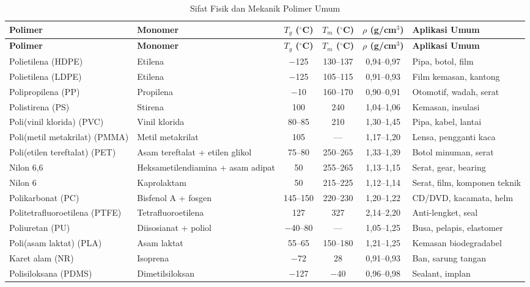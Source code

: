 \documentclass[12pt,a4paper,openany]{book}
\begin{document}
\begin{longtable}{p{3.2cm}p{2.8cm}cccp{2.5cm}}
\caption{Sifat Fisik dan Mekanik Polimer Umum} \\
\toprule
\textbf{Polimer} & \textbf{Monomer} & \textbf{$T_g$ ($^{\circ}$C)} & \textbf{$T_m$ ($^{\circ}$C)} & \textbf{$\rho$ (g/cm$^3$)} & \textbf{Aplikasi Umum} \\
\midrule
\endfirsthead
\toprule
\textbf{Polimer} & \textbf{Monomer} & \textbf{$T_g$ ($^{\circ}$C)} & \textbf{$T_m$ ($^{\circ}$C)} & \textbf{$\rho$ (g/cm$^3$)} & \textbf{Aplikasi Umum} \\
\midrule
\endhead
\bottomrule
\endfoot

Polietilena (HDPE) & Etilena & $-$125 & 130--137 & 0,94--0,97 & Pipa, botol, film \\
Polietilena (LDPE) & Etilena & $-$125 & 105--115 & 0,91--0,93 & Film kemasan, kantong \\
Polipropilena (PP) & Propilena & $-$10 & 160--170 & 0,90--0,91 & Otomotif, wadah, serat \\
Polistirena (PS) & Stirena & 100 & 240 & 1,04--1,06 & Kemasan, insulasi \\
Poli(vinil klorida) (PVC) & Vinil klorida & 80--85 & 210 & 1,30--1,45 & Pipa, kabel, lantai \\
Poli(metil metakrilat) (PMMA) & Metil metakrilat & 105 & --- & 1,17--1,20 & Lensa, pengganti kaca \\
Poli(etilen tereftalat) (PET) & Asam tereftalat + etilen glikol & 75--80 & 250--265 & 1,33--1,39 & Botol minuman, serat \\
Nilon 6,6 & Heksametilendiamina + asam adipat & 50 & 255--265 & 1,13--1,15 & Serat, gear, bearing \\
Nilon 6 & Kaprolaktam & 50 & 215--225 & 1,12--1,14 & Serat, film, komponen teknik \\
Polikarbonat (PC) & Bisfenol A + fosgen & 145--150 & 220--230 & 1,20--1,22 & CD/DVD, kacamata, helm \\
Politetrafluoroetilena (PTFE) & Tetrafluoroetilena & 127 & 327 & 2,14--2,20 & Anti-lengket, seal \\
Poliuretan (PU) & Diisosianat + poliol & $-$40--80 & --- & 1,05--1,25 & Busa, pelapis, elastomer \\
Poli(asam laktat) (PLA) & Asam laktat & 55--65 & 150--180 & 1,21--1,25 & Kemasan biodegradabel \\
Karet alam (NR) & Isoprena & $-$72 & 28 & 0,91--0,93 & Ban, sarung tangan \\
Polisiloksana (PDMS) & Dimetilsiloksan & $-$127 & $-$40 & 0,96--0,98 & Sealant, implan \\

\end{longtable}
\end{document}
